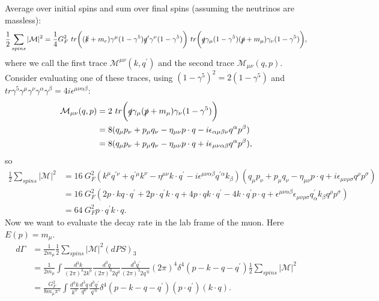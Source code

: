 \documentclass[a4paper,12pt]{article}
\begin{document}
Average over initial spins and sum over final spins (assuming the neutrinos are massless):
\begin{equation}
    \frac{1}{2} \sum_{spins} |\mathcal{M}|^2 = \frac{1}{4}G_F^2\ tr\bigg((\slashed{k}+m_e)\gamma^\mu(1-\gamma^5)\slashed{q}^\prime\gamma^\nu(1-\gamma^5)\bigg)\ tr\bigg(\slashed{q}\gamma_\mu(1-\gamma^5)(\slashed{p}+m_\mu)\gamma_\nu(1-\gamma^5)\bigg),
\end{equation}
where we call the first trace $\mathcal{M}^{\mu \nu}(k,q^\prime)$ and the second trace $\mathcal{M}_{\mu \nu}(q,p)$. Consider evaluating one of these traces, using $(1-\gamma^5)^2 = 2(1-\gamma^5)$ and $tr\gamma^5\gamma^\mu \gamma^\nu \gamma^\alpha \gamma^\beta = 4i\epsilon^{\mu \nu \alpha \beta}$:
\begin{equation}
\begin{split}
    \mathcal{M}_{\mu \nu}(q,p) &= 2\ tr\bigg( \slashed{q}\gamma_\mu(\slashed{p} + m_\mu)\gamma_\nu(1-\gamma^5)\bigg)\\
    &= 8(q_\mu p_\nu + p_\mu q_\nu - \eta_{\mu \nu} p \cdot q - i \epsilon_{\alpha \mu \beta \nu} q^\alpha p^\beta) \\
    &= 8(q_\mu p_\nu + p_\mu q_\nu - \eta_{\mu \nu} p \cdot q + i \epsilon_{\mu \nu \alpha \beta} q^\alpha p^\beta),
\end{split}
\end{equation}
so
\begin{equation}
\begin{split}
\frac{1}{2}\sum_{spins}|\mathcal{M}|^2 &= 16\ G_F^2(k^\mu q^{\prime \nu} + q^{\prime \mu} k^\nu - \eta^{\mu \nu} k \cdot q^\prime - i \epsilon^{\mu \nu \alpha \beta} q^{\prime \alpha} k_\beta)(q_\mu p_\nu + p_\mu q_\nu - \eta_{\mu \nu} p \cdot q + i \epsilon_{\mu \nu \rho \sigma} q^\rho p^\sigma) \\
&= 16\ G_F^2(2p\cdot k q \cdot q^\prime + 2 p \cdot q^\prime k \cdot q + 4 p \cdot q k \cdot q^\prime - 4 k \cdot q^\prime p \cdot q + \epsilon^{\mu \nu \alpha \beta} \epsilon_{\mu \nu \rho \sigma} q^\prime_\alpha k_\beta q^\rho p^\sigma) \\
&= 64\ G_F^2 p \cdot q^\prime k \cdot q.
\end{split}
\end{equation}
Now we want to evaluate the decay rate in the lab frame of the muon. Here $E(p) = m_\mu$.
\begin{equation}
\begin{split}
d\Gamma &= \frac{1}{2m_\mu}\frac{1}{2}\sum_{spins}|\mathcal{M}|^2(dPS)_3 \\
& = \frac{1}{2m_\mu} \int \frac{d^3k}{(2\pi)^3 2k^0}\frac{d^3q}{(2\pi)^3 2q^0}\frac{d^3q^\prime}{(2\pi)^3 2q^{\prime 0}}(2\pi)^4\delta^4(p-k-q-q^\prime)\frac{1}{2}\sum_{spins}|\mathcal{M}|^2 \\
&= \frac{G_F^2}{8 m_\mu \pi^5} \int \frac{d^3k}{k^0} \frac{d^3q}{q^0} \frac{d^3q^\prime}{q^{\prime 0}} \delta^4(p-k-q-q^\prime)(p \cdot q^\prime)(k \cdot q).
\end{split}
\end{equation}
\end{document}
